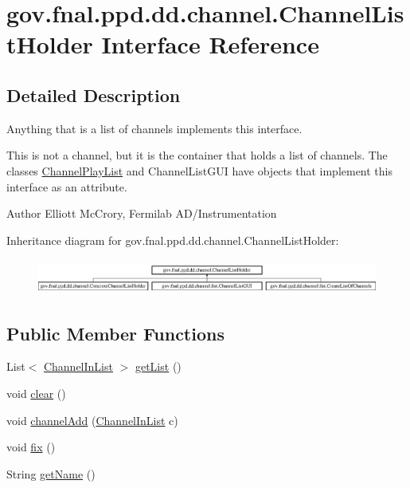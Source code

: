 \hypertarget{interfacegov_1_1fnal_1_1ppd_1_1dd_1_1channel_1_1ChannelListHolder}{\section{gov.\-fnal.\-ppd.\-dd.\-channel.\-Channel\-List\-Holder Interface Reference}
\label{interfacegov_1_1fnal_1_1ppd_1_1dd_1_1channel_1_1ChannelListHolder}
}


\subsection{Detailed Description}
Anything that is a list of channels implements this interface.

This is not a channel, but it is the container that holds a list of channels. The classes \hyperlink{classgov_1_1fnal_1_1ppd_1_1dd_1_1channel_1_1ChannelPlayList}{Channel\-Play\-List} and Channel\-List\-G\-U\-I have objects that implement this interface as an attribute.

\begin{DoxyAuthor}{Author}
Elliott Mc\-Crory, Fermilab A\-D/\-Instrumentation 
\end{DoxyAuthor}
Inheritance diagram for gov.\-fnal.\-ppd.\-dd.\-channel.\-Channel\-List\-Holder\-:\begin{figure}[H]
\begin{center}
\leavevmode
\includegraphics[height=1.174004cm]{interfacegov_1_1fnal_1_1ppd_1_1dd_1_1channel_1_1ChannelListHolder}
\end{center}
\end{figure}
\subsection*{Public Member Functions}
\begin{DoxyCompactItemize}
\item 
List$<$ \hyperlink{interfacegov_1_1fnal_1_1ppd_1_1dd_1_1channel_1_1ChannelInList}{Channel\-In\-List} $>$ \hyperlink{interfacegov_1_1fnal_1_1ppd_1_1dd_1_1channel_1_1ChannelListHolder_a964a6a5e52085e0c24f855f71428d5c3}{get\-List} ()
\item 
void \hyperlink{interfacegov_1_1fnal_1_1ppd_1_1dd_1_1channel_1_1ChannelListHolder_ac8fd01c353de039cc05d830b971e87b1}{clear} ()
\item 
void \hyperlink{interfacegov_1_1fnal_1_1ppd_1_1dd_1_1channel_1_1ChannelListHolder_a8541dd9579b0387798a620920cefb18e}{channel\-Add} (\hyperlink{interfacegov_1_1fnal_1_1ppd_1_1dd_1_1channel_1_1ChannelInList}{Channel\-In\-List} c)
\item 
void \hyperlink{interfacegov_1_1fnal_1_1ppd_1_1dd_1_1channel_1_1ChannelListHolder_a6d75a17b8c7a601e8f23dce56386fbc3}{fix} ()
\item 
String \hyperlink{interfacegov_1_1fnal_1_1ppd_1_1dd_1_1channel_1_1ChannelListHolder_a9e2d59130d1583a9eaa93840ba1c4004}{get\-Name} ()
\end{DoxyCompactItemize}



